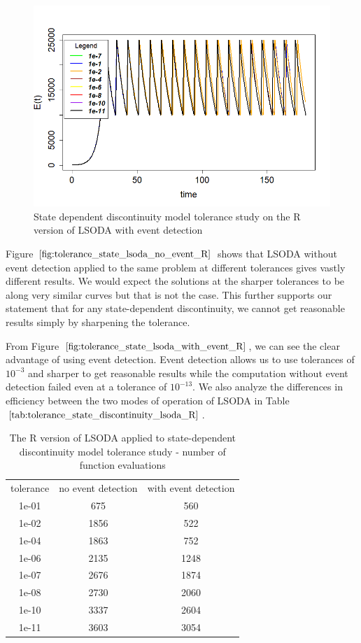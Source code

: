 \begin{figure}[h]
\centering
\includegraphics[width=0.7\linewidth]{./figures/tolerance_state_lsoda_with_event_R}
\caption{State dependent discontinuity model tolerance study on the R version of LSODA with event detection}
\label{fig:tolerance_state_lsoda_with_event_R}
\end{figure}

Figure $\ref{fig:tolerance_state_lsoda_no_event_R}$ shows that LSODA without event detection applied to the same problem at different tolerances gives vastly different results. We would expect the solutions at the sharper tolerances to be along very similar curves but that is not the case. This further supports our statement that for any state-dependent discontinuity, we cannot get reasonable results simply by sharpening the tolerance.

From Figure $\ref{fig:tolerance_state_lsoda_with_event_R}$, we can see the clear advantage of using event detection. Event detection allows us to use tolerances of $10^{-3}$ and sharper to get reasonable results while the computation without event detection failed even at a tolerance of $10^{-13}$. We also analyze the differences in efficiency between the two modes of operation of LSODA in Table $\ref{tab:tolerance_state_discontinuity_lsoda_R}$.

\begin{table}[h]
\caption {The R version of LSODA applied to state-dependent discontinuity model tolerance study - number of function evaluations} \label{tab:tolerance_state_discontinuity_lsoda_R} 
\begin{center}
\begin{tabular}{ c c c }
tolerance & no event detection & with event detection \\
1e-01 & 675 & 560 \\
1e-02 & 1856 & 522 \\
1e-04 & 1863 & 752 \\
1e-06 & 2135 & 1248 \\
1e-07 & 2676 & 1874 \\
1e-08 & 2730 & 2060 \\
1e-10 & 3337 & 2604 \\
1e-11 & 3603 & 3054 \\
\end{tabular}
\end{center}
\end{table}

